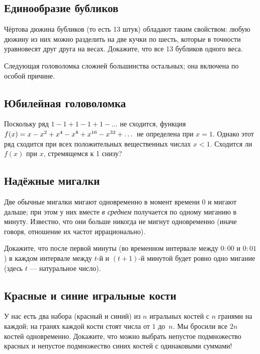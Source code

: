 \subsection*{Единообразие бубликов}\label{Единообразие бубликов}

Чёртова дюжина бубликов (то есть 13 штук) обладают таким свойством: любую дюжину из них можно разделить на две кучки по шесть, которые в точности уравновесят друг друга на весах.
Докажите, что все 13 бубликов одного веса.

\medskip

{\sloppy 

Следующая головоломка сложней большинства остальных;
она включена по особой причине.

}

\subsection*{Юбилейная головоломка}

Поскольку ряд $1 - 1 + 1 - 1 + 1 - \dots$ не сходится,  функция 
$f(x)\z=x-x^2+x^4-x^8+x^{16}-x^{32}+\dots$ не определена при $x=1$.
Однако этот ряд сходится при всех положительных вещественных числах $x<1$.
Сходится ли $f(x)$ при $x$, стремящемся к 1 снизу?

\subsection*{Надёжные мигалки}\label{Надёжные мигалки}

Две обычные мигалки мигают одновременно в момент времени $0$
и мигают дальше; при этом у них вместе \emph{в среднем} получается по одному миганию в минуту.
Известно, что они больше никогда не мигнут одновременно (иначе говоря, отношение их частот иррационально).

Докажите, что после первой минуты (во временном интервале между $0{:}00$ и $0{:}01$) в каждом интервале между $t$-й и $(t + 1)$-й минутой будет ровно одно мигание (здесь $t$ --- натуральное число).

\subsection*{Красные и синие игральные кости}\label{Красные и синие игральные кости}

У нас есть два набора (красный и синий) из $n$ игральных костей с $n$ гранями на каждой;
на гранях каждой кости стоят числа от $1$ до~$n$.
Мы бросили все $2n$ костей одновременно.
Докажите, что можно выбрать непустое подмножество красных и непустое подмножество синих костей с одинаковыми суммами!
